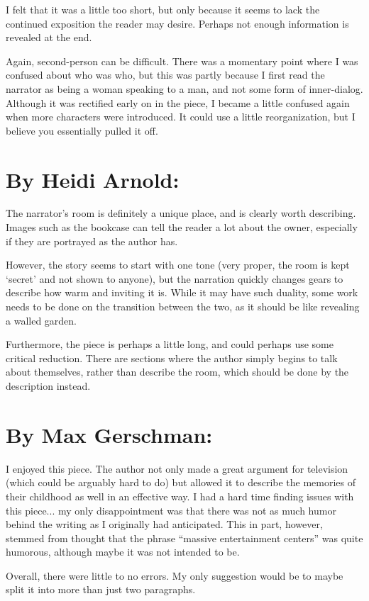 \documentclass[letterpaper]{article}
\begin{document}
I felt that it was a little too short, but only because it seems to lack the continued exposition the reader may desire. Perhaps not enough information is revealed at the end. 
		
Again, second-person can be difficult. There was a momentary point where I was confused about who was who, but this was partly because I first read the narrator as being a woman speaking to a man, and not some form of inner-dialog. Although it was rectified early on in the piece, I became a little confused again when more characters were introduced. It could use a little reorganization, but I believe you essentially pulled it off.
	\section{By Heidi Arnold:}
		The narrator's room is definitely a unique place, and is clearly worth describing. Images such as the bookcase can tell the reader a lot about the owner, especially if they are portrayed as the author has.
		
However, the story seems to start with one tone (very proper, the room is kept `secret' and not shown to anyone), but the narration quickly changes gears to describe how warm and inviting it is. While it may have such duality, some work needs to be done on the transition between the two, as it should be like revealing a walled garden.
		
Furthermore, the piece is perhaps a little long, and could perhaps use some critical reduction. There are sections where the author simply begins to talk about themselves, rather than describe the room, which should be done by the description instead.
	\section{By Max Gerschman:}
		I enjoyed this piece. The author not only made a great argument for television (which could be arguably hard to do) but allowed it to describe the memories of their childhood as well in an effective way. I had a hard time finding issues with this piece... my only disappointment was that there was not as much humor behind the writing as I originally had anticipated. This in part, however, stemmed from thought that the phrase ``massive entertainment centers'' was quite humorous, although maybe it was not intended to be.
		
Overall, there were little to no errors. My only suggestion would be to maybe split it into more than just two paragraphs.

   
\end{document}
